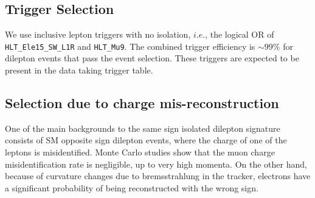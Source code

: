 \subsection{Trigger Selection}
\label{sec:trigger}
We use inclusive lepton triggers with no isolation, $i.e.$, the logical OR of {\tt HLT\_Ele15\_SW\_L1R} and {\tt HLT\_Mu9}.  
The combined trigger efficiency is $\sim 99$\% for dilepton events that pass the event selection.
These triggers are 
expected to be present in the data taking trigger table.

\subsection{Selection due to charge mis-reconstruction}
\label{sec:gsfctf}
One of the main backgrounds to the same sign isolated dilepton signature consists of 
SM opposite sign dilepton events, where the charge of one of the leptons is misidentified.
Monte Carlo studies show that the muon charge misidentification rate is negligible, up to very 
high momenta.  On the other hand, because of curvature changes due to bremsstrahlung in the tracker, electrons have a 
significant probability of being reconstructed with the wrong sign. 


